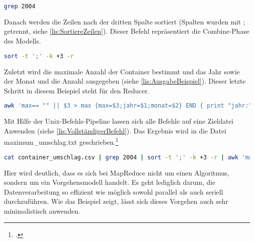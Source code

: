 \begin{lstlisting}[language=bash, caption={Befehl zur Anzeige aller Zeilen mit Jahr 2004\protect\footnotemark}, label=lis:Grep2004]
grep 2004
\end{lstlisting}

Danach werden die Zeilen nach der dritten Spalte sortiert (Spalten wurden mit ; getrennt, siehe \autoref{lis:SortiereZeilen}). Dieser Befehl repräsentiert die Combine-Phase des Modells. \\

\begin{lstlisting}[language=bash, caption={Befehl zur Sortierung der Zeilen nach der dritten Spalte\protect\footnotemark}, label=lis:SortiereZeilen]
sort -t ';' -k +3 -r
\end{lstlisting}

Zuletzt wird die maximale Anzahl der Container bestimmt und das Jahr sowie der Monat und die Anzahl ausgegeben (siehe \autoref{lis:AusgabeBeispiel}). Dieser letzte Schritt in diesem Beispiel steht für den Reducer. \\

\begin{lstlisting}[language=bash, caption={Ausgabe des Beispielprogramms\protect\footnotemark}, label=lis:AusgabeBeispiel]
awk 'max== "" || $3 > max {max=$3;jahr=$1;monat=$2} END { print "jahr:" jahr; print "monat:" monat; print "anzahl:" max;}' FS=";"
\end{lstlisting}

Mit Hilfe der Unix-Befehls-Pipeline lassen sich alle Befehle auf eine Zieldatei Anwenden (siehe \autoref{lis:VollständigerBefehl}). Das Ergebnis wird in die Datei maximum\_umschlag.txt geschrieben.\footcite[Vgl.][S. 26 ff]{Wartala.2012} \\

\begin{lstlisting}[language=bash, caption={Vollständiger Befehl zur Auswertung der Beispieldaten\protect\footnotemark}, label=lis:VollständigerBefehl]
cat container_umschlag.csv | grep 2004 | sort -t ';' -k +3 -r | awk 'max== "" || $3 > max {max=$3;jahr=$1;monat=$2} END { print "jahr:" jahr; print "monat:" monat; print "anzahl:" max;}' FS=";" | cat > maximum_umschlag.txt
\end{lstlisting}

Hier wird deutlich, dass es sich bei MapReduce nicht um einen Algoritmus, sondern um ein Vorgehensmodell handelt. Es geht lediglich darum, die Datenverarbeitung so effizient wie möglich sowohl parallel als auch seriell durchzuführen. Wie das Beispiel zeigt, lässt sich dieses Vorgehen auch sehr minimalistisch anwenden.

